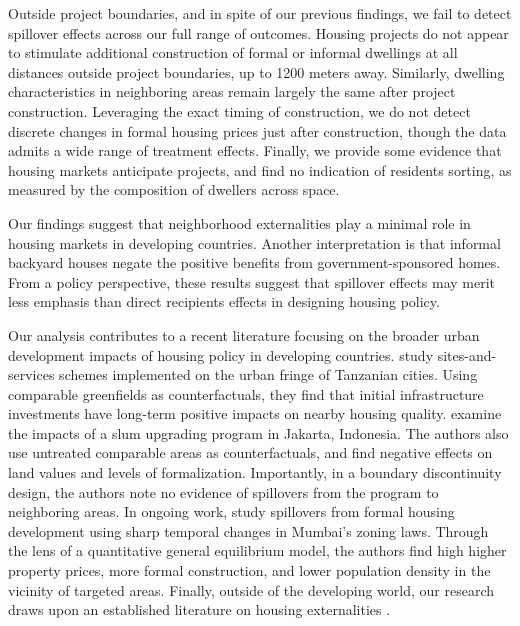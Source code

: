\documentclass[12pt]{article}
\begin{document}
Outside project boundaries, and in spite of our previous findings, we fail to detect spillover effects  across our full range of outcomes.  Housing projects do not appear to stimulate additional construction of formal or informal dwellings at all distances outside project boundaries, up to 1200 meters away. Similarly, dwelling characteristics in neighboring areas remain largely the same after project construction.  Leveraging the exact timing of construction, we do not detect discrete changes in formal housing prices just after construction, though the data admits a wide range of treatment effects. Finally, we provide some evidence that housing markets anticipate projects, and find no indication of residents sorting, as measured by the composition of dwellers across space. 

Our findings suggest that neighborhood externalities play a minimal role in housing markets in developing countries.  Another interpretation is that informal backyard houses negate the positive benefits from government-sponsored homes. From a policy perspective, these results suggest that spillover effects may merit less emphasis than direct recipients effects in designing housing policy.  

Our analysis contributes to a recent literature focusing on the broader urban development impacts of housing policy in developing countries. \cite{baruah2017planning} study sites-and-services schemes implemented on the urban fringe of Tanzanian cities. Using comparable greenfields as counterfactuals, they find that initial infrastructure investments have long-term positive impacts on nearby housing quality. \cite{harari2018slum} examine the impacts of a slum upgrading program in Jakarta, Indonesia. The authors also use untreated comparable areas as counterfactuals, and find negative effects on land values and levels of formalization. Importantly, in a boundary discontinuity design, the authors note no evidence of spillovers from the program to neighboring areas. In ongoing work, \cite{gechter2018slums} study spillovers from formal housing development using sharp temporal changes in Mumbai's zoning laws. Through the lens of a quantitative general equilibrium model, the authors find high higher property prices,  more formal construction, and lower population density in the vicinity of targeted areas. Finally, outside of the developing world, our research draws upon an established literature on housing externalities \citep{rossi2010housing,hornbeck2017creative,diamond2016wants}. 
\end{document}
